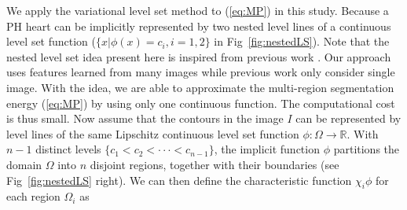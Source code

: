 \documentclass[runningheads,a4paper]{llncs}
\begin{document}
We apply the variational level set method \cite{duan2014some,tan2018image} to (\ref{eq:MP}) in this study. Because a PH heart can be implicitly represented by two nested level lines of a continuous level set function ($\{x|\phi(x)=c_i, i=1,2\}$ in Fig~\ref{fig:nestedLS}). Note that the nested level set idea present here is inspired from previous work \cite{feng2013segmentation,chung2009image}. Our approach uses features learned from many images while previous work only consider single image. With the idea, we are able to approximate the multi-region segmentation energy (\ref{eq:MP}) by using only one continuous function. The computational cost is thus small. Now assume that the contours in the image $I$ can be represented by level lines of the same Lipschitz continuous level set function $\phi:\Omega \to \mathbb{R}$. With $n-1$ distinct levels $\{c_1 < c_2 < \cdot \cdot \cdot <c_{n-1}\}$, the implicit function $\phi$ partitions the domain $\Omega$ into $n$ disjoint regions, together with their boundaries (see Fig~\ref{fig:nestedLS} right). We can then define the characteristic function $\chi_i\phi$ for each region $\Omega_i$ as
\end{document}
